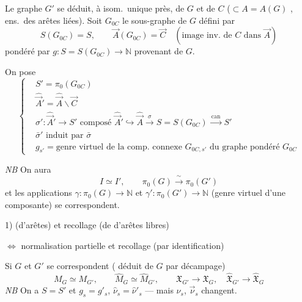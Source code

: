 \documentclass[11pt,a4paper]{article}
\begin{document}

 Le graphe \struck{\ill{}} $G'$ se déduit, à isom.\ unique près, de $G$ et de $C$ ($\subset A=A(G)$ , ens.\ des arêtes liées). Soit $G_{0C}$ le sous-graphe de $G$ défini par
\[
S(G_{0C})=S,\qquad
\vec{A}(G_{0C})=\vec{C}\quad(\text{image inv.\ de } C \text{ dans } \vec{A})
\]
pondéré par $g : S=S(G_{0C})\to\mathbb{N}$ provenant de $G$.

On pose
\[
\left\{
\begin{aligned}
&S'=\pi_0(G_{0C})\\
&\hat{\vec{A}}{}'=\hat{\vec{A}}\smallsetminus\vec{C}\\
&\sigma':\hat{\vec{A}}{}'\to S' \text{ composé } \hat{\vec{A}}{}'\hookrightarrow\hat{\vec{A}}\xrightarrow{\ \sigma\ }S=S(G_{0C})\xrightarrow{\ \mathrm{can}\ }S'\\
&\bar\sigma' \text{ induit par } \bar\sigma\\
&g_{s'} = \text{genre virtuel de la comp.\ connexe } G_{0C,s'} \text{ du graphe pondéré } G_{0C}
\end{aligned}
\right.
\]

\emph{NB} On aura
\[
I\simeq I',\qquad \pi_0(G)\xrightarrow{\ \sim\ }\pi_0(G')
\]
et les applications $\gamma:\pi_0(G)\to\mathbb{N}$ et $\gamma':\pi_0(G')\to\mathbb{N}$ (genre virtuel d'une composante) se correspondent.

1)   (d'arêtes) et recollage (de  d'arêtes libres)

$\Leftrightarrow$ normalisation partielle et recollage (par identification)

Si $G$ et $G'$ se correspondent ( déduit de $G$ par décampage)
\[
M_G\simeq M_{G'},\qquad \hat{M}_G\simeq\hat{M}_{G'},\qquad
\mathfrak{X}_{G'}\to\mathfrak{X}_G,\quad \hat{\mathfrak{X}}_{G'}\to\hat{\mathfrak{X}}_G
\]
\emph{NB} On a $S=S'$ et $g_s=g'_s$, $\hat{\nu}_s=\hat{\nu}'_s$ --- mais \struck{\ill{}} $\nu_s$, $\vec{\nu}_s$ changent.
\end{document}
